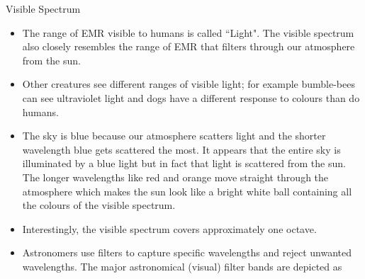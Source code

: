 {
{\Large Visible Spectrum \hspace{0.05in}
}
\begin{itemize}

\item The range of EMR visible to humans is called ``Light". The visible spectrum also closely resembles the range of EMR that filters through our atmosphere from the sun.

\item Other creatures see different ranges of visible light; for example bumble-bees can see ultraviolet light and dogs have a different response to colours than do humans.

\item The sky is blue because our atmosphere scatters light and the shorter wavelength blue gets scattered the most. It appears that the entire sky is illuminated by a blue light but in fact that light is scattered from the sun. The longer wavelengths like red and orange move straight through the atmosphere which makes the sun look like a bright white ball containing all the colours of the visible spectrum.

\item Interestingly, the visible spectrum covers approximately one octave.

\item Astronomers use filters to capture specific wavelengths and reject unwanted wavelengths. The major astronomical (visual) filter bands are depicted as  

\end{itemize}
}
